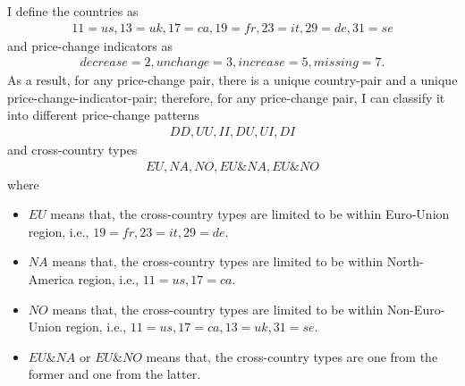 I define the countries as 
\begin{align}
11=us, 13=uk, 17=ca, 19=fr, 23=it, 29=de, 31=se
\end{align}
and price-change indicators as 
\begin{align}
decrease=2, unchange=3, increase=5, missing=7.
\end{align}
As a result, for any price-change pair, there is a unique country-pair and a unique price-change-indicator-pair; therefore, for any price-change pair, I can classify it into different price-change patterns
\begin{align}
DD, UU,II,DU,UI,DI
\end{align}
and cross-country types
\begin{align}
EU, NA, NO, EU\&NA, EU\&NO
\end{align}
where
\begin{itemize}
	\item $ EU $ means that, the cross-country types are limited to be within Euro-Union region, i.e., $ 19=fr, 23=it, 29=de $.
	\item $ NA $ means that, the cross-country types are limited to be within North-America region, i.e., $ 11=us, 17=ca $.
	\item $ NO $ means that, the cross-country types are limited to be within Non-Euro-Union region, i.e., $ 11=us, 17=ca, 13=uk, 31=se $.
	\item $ EU\&NA $ or $ EU\&NO $ means that, the cross-country types are one from the former and one from the latter.
\end{itemize}

